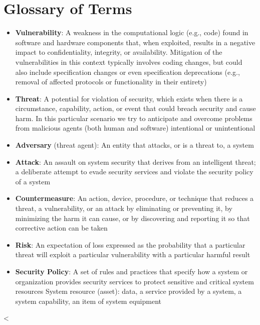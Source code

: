 

\chapter{Glossary of Terms}\label{ch:glossary}

  \begin{itemize}
    \item \textbf{Vulnerability}:
      A weakness in the computational logic (e.g., code) found
      in software and hardware components that, when exploited, results in a
      negative impact to confidentiality, integrity, or availability.
      Mitigation of the vulnerabilities in this context typically involves
      coding changes, but could also include specification changes or even
      specification deprecations (e.g., removal of affected protocols or
      functionality in their entirety)
    \item \textbf{Threat}:
      A potential for violation of security, which exists when there is a
      circumstance, capability, action, or event that could breach security and
      cause harm. In this particular scenario we try to anticipate and overcome
      problems from malicious agents (both human and software) intentional or
      unintentional
    \item \textbf{Adversary} (threat agent):
      An entity that attacks, or is a threat to, a system
    \item \textbf{Attack}:
      An assault on system security that derives from an intelligent threat; a
      deliberate attempt to evade security services and violate the security
      policy of a system
    \item \textbf{Countermeasure}:
      An action, device, procedure, or technique that reduces a threat, a
      vulnerability, or an attack by eliminating or preventing it, by minimizing
      the harm it can cause, or by discovering and reporting it so that
      corrective action can be taken
    \item \textbf{Risk}:
      An expectation of loss expressed as the probability that a particular
      threat will exploit a particular vulnerability with a particular harmful
      result
    \item \textbf{Security Policy}:
      A set of rules and practices that specify how a system or organization
      provides security services to protect sensitive and critical system
      resources System resource (asset): data, a service provided by a system, a
      system capability, an item of system equipment
  \end{itemize}


<%
